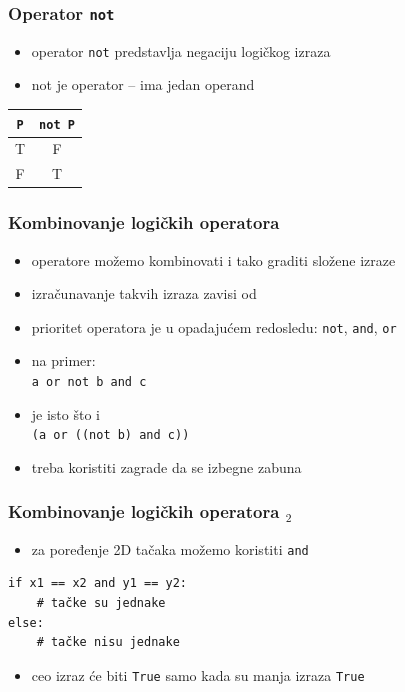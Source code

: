 \documentclass[utf8,compress]{beamer}
\begin{document}
\begin{frame}[fragile]
  \frametitle{Operator \texttt{not}}
  \begin{itemize}
    \item operator \texttt{not} predstavlja negaciju logičkog izraza
    \item not je  operator -- ima jedan operand
  \end{itemize}
  \begin{center}
  \begin{tabular}{c|c}
    \texttt{P} & \texttt{not P} \\ \hline
    T & F \\ \hline
    F & T 
  \end{tabular}
  \end{center}
\end{frame}

\begin{frame}[fragile]
  \frametitle{Kombinovanje logičkih operatora}
  \begin{itemize}
    \item operatore možemo kombinovati i tako graditi složene izraze
    \item izračunavanje takvih izraza zavisi od 
    \item prioritet operatora je u opadajućem redosledu: \texttt{not}, \texttt{and}, \texttt{or}
    \item na primer: \\ \texttt{a or not b and c}
    \item je isto što i \\ \texttt{(a or ((not b) and c))}
    \item treba koristiti zagrade da se izbegne zabuna
  \end{itemize}
\end{frame}

\begin{frame}[fragile]
  \frametitle{Kombinovanje logičkih operatora $_2$}
  \begin{itemize}
    \item za poređenje 2D tačaka možemo koristiti \texttt{and}
  \end{itemize}
\begin{verbatim}
if x1 == x2 and y1 == y2:
    # tačke su jednake
else:
    # tačke nisu jednake
\end{verbatim}
  \begin{itemize}
    \item ceo izraz će biti \texttt{True} samo kada su  manja izraza \texttt{True}
  \end{itemize}
\end{frame}
\end{document}
